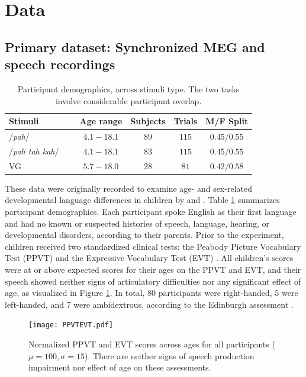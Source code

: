 \documentclass[utf8]{frontiersSCNS} %
\begin{document}
\section{Data}

\subsection{Primary dataset: Synchronized MEG and speech recordings}

\begin{table}[t]
  \centering
  \begin{tabular}{ l@{}c c c c }
    \toprule
    \textbf{Stimuli} & \textbf{Age range} & \textbf{Subjects} & \textbf{Trials}  & \textbf{M/F Split} \\
    \midrule
    /{\em pah}/~~~                    & $4.1-18.1$   &   $89$   &   $115$   &   $0.45/0.55$ \\
    /{\em pah tah kah}/~~~            & $4.1-18.1$   &   $83$   &   $115$   &   $0.45/0.55$ \\
    VG~~~                             & $5.7-18.0$   &   $28$   &   $81$    &   $0.42/0.58$  \\
    \bottomrule
  \end{tabular}
  \caption{Participant demographics, across stimuli type. The two tasks involve considerable participant overlap.}
  \label{tab:subjects}
\end{table}

These data were originally recorded to examine age- and sex-related developmental language differences in children by \cite{Doesburg2016} and \cite{Yu2014}. Table \ref{tab:subjects} summarizes  participant demographics. Each participant spoke English as their first language and had no known or suspected histories of speech, language, hearing, or developmental disorders, according to their parents. Prior to the experiment, children received two standardized clinical tests: the Peabody Picture Vocabulary Test (PPVT) \cite{Dunn97} and the Expressive Vocabulary Test (EVT) \cite{EVT}. All children's scores were at or above expected scores for their ages on the PPVT and EVT, and their speech showed neither signs of articulatory difficulties nor any significant effect of age, as visualized in Figure \ref{fig:ppvtevt}. In total, 80 participants were right-handed, 5 were left-handed, and 7 were ambidextrous, according to the Edinburgh assessment \cite{Oldfield1971}. %

\begin{figure}[htp]
\texttt{[image: PPVTEVT.pdf]}
\caption{Normalized PPVT and EVT scores across ages for all participants ($\mu=100, \sigma=15$). There are neither signs of speech production impairment nor effect of age on these assessments.}
\label{fig:ppvtevt}
\end{figure}
\end{document}
